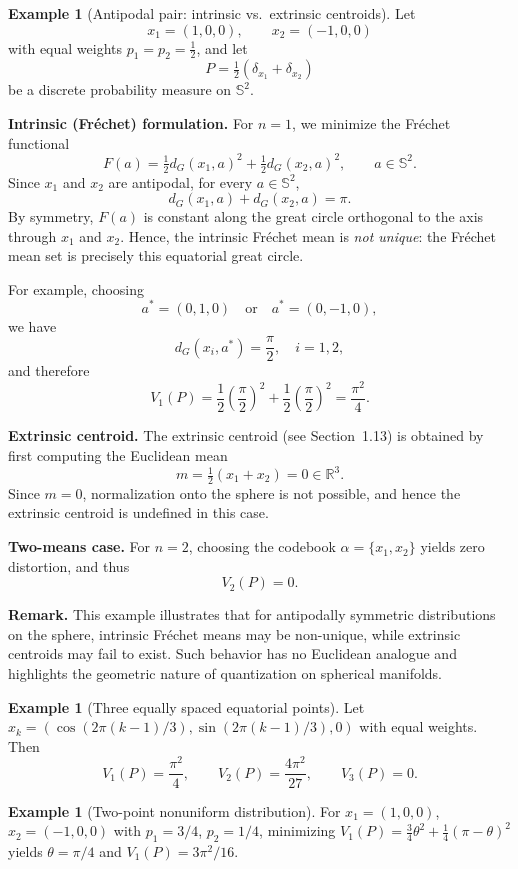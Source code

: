 \documentclass[12pt, reqno]{amsart}
\theoremstyle{plain}
\theoremstyle{definition}
\newtheorem{exam}[subsection]{Example}
\newcommand{\D}[1]{\mathbb{#1}}%
\begin{document}
\begin{exam}[Antipodal pair: intrinsic vs.\ extrinsic centroids]
Let
\[
x_1=(1,0,0), \qquad x_2=(-1,0,0)
\]
with equal weights \(p_1=p_2=\tfrac12\), and let
\[
P=\tfrac12(\delta_{x_1}+\delta_{x_2})
\]
be a discrete probability measure on \(\D S^2\).

\medskip
\noindent
\textbf{Intrinsic (Fr\'echet) formulation.}
For \(n=1\), we minimize the Fr\'echet functional
\[
F(a)=\tfrac12 d_G(x_1,a)^2+\tfrac12 d_G(x_2,a)^2, \qquad a\in \D S^2.
\]
Since \(x_1\) and \(x_2\) are antipodal, for every \(a\in \D S^2\),
\[
d_G(x_1,a)+d_G(x_2,a)=\pi.
\]
By symmetry, \(F(a)\) is constant along the great circle orthogonal to the axis through
\(x_1\) and \(x_2\). Hence, the intrinsic Fr\'echet mean is \emph{not unique}: the Fr\'echet
mean set is precisely this equatorial great circle.

For example, choosing
\[
a^*=(0,1,0) \quad \text{or} \quad a^*=(0,-1,0),
\]
we have
\[
d_G(x_i,a^*)=\frac{\pi}{2}, \quad i=1,2,
\]
and therefore
\[
V_1(P)
=\frac12\left(\frac{\pi}{2}\right)^2
+\frac12\left(\frac{\pi}{2}\right)^2
=\frac{\pi^2}{4}.
\]

\medskip
\noindent
\textbf{Extrinsic centroid.}
The extrinsic centroid (see Section~1.13) is obtained by first computing the Euclidean mean
\[
m=\tfrac12(x_1+x_2)=0\in\mathbb{R}^3.
\]
Since \(m=0\), normalization onto the sphere is not possible, and hence the extrinsic
centroid is undefined in this case.

\medskip
\noindent
\textbf{Two-means case.}
For \(n=2\), choosing the codebook \(\alpha=\{x_1,x_2\}\) yields zero distortion, and thus
\[
V_2(P)=0.
\]

\medskip
\noindent
\textbf{Remark.}
This example illustrates that for antipodally symmetric distributions on the sphere,
intrinsic Fr\'echet means may be non-unique, while extrinsic centroids may fail to exist.
Such behavior has no Euclidean analogue and highlights the geometric nature of
quantization on spherical manifolds.
\end{exam}

\begin{exam}[Three equally spaced equatorial points]
Let $x_k=(\cos(2\pi(k-1)/3),\sin(2\pi(k-1)/3),0)$ with equal weights.
Then
\[
V_1(P)=\frac{\pi^2}{4},\qquad 
V_2(P)=\frac{4\pi^2}{27},\qquad 
V_3(P)=0.
\]
\end{exam}

\begin{exam}[Two-point nonuniform distribution]
For $x_1=(1,0,0)$, $x_2=(-1,0,0)$ with $p_1=3/4$, $p_2=1/4$,
minimizing
\(
V_1(P)=\frac34\theta^2+\frac14(\pi-\theta)^2
\)
yields $\theta=\pi/4$ and $V_1(P)=3\pi^2/16$.
\end{exam}
\end{document}
